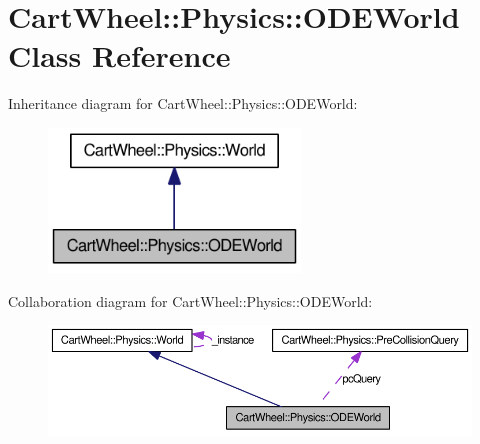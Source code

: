 \hypertarget{classCartWheel_1_1Physics_1_1ODEWorld}{
\section{CartWheel::Physics::ODEWorld Class Reference}
\label{classCartWheel_1_1Physics_1_1ODEWorld}
}


Inheritance diagram for CartWheel::Physics::ODEWorld:\nopagebreak
\begin{figure}[H]
\begin{center}
\leavevmode
\includegraphics[width=190pt]{classCartWheel_1_1Physics_1_1ODEWorld__inherit__graph}
\end{center}
\end{figure}


Collaboration diagram for CartWheel::Physics::ODEWorld:\nopagebreak
\begin{figure}[H]
\begin{center}
\leavevmode
\includegraphics[width=400pt]{classCartWheel_1_1Physics_1_1ODEWorld__coll__graph}
\end{center}
\end{figure}
